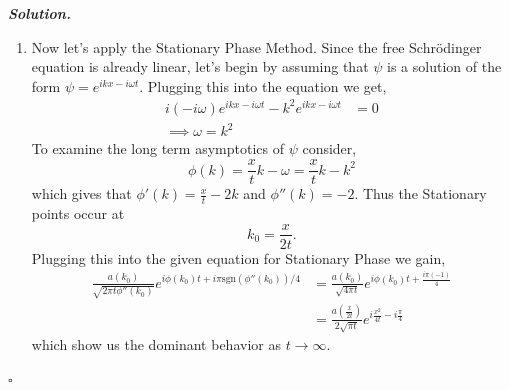 \documentclass[12pt]{report}
\newenvironment{solution}[1][\it{Solution}]{\textbf{#1. } }{$\square$}
\begin{document}
\begin{solution}
\begin{enumerate}
        \item Now let's apply the Stationary Phase Method. Since the free Schr\"odinger equation is already linear, let's begin by assuming that $\psi$ is a solution of the form $\psi = e^{ikx - i\omega t}$. Plugging this into the equation we get,
        \begin{align*}
            i(-i\omega)e^{ikx - i\omega t} - k^2 e^{ikx - i\omega t} &= 0\\
            \implies \omega = k^2
        \end{align*}
        To examine the long term asymptotics of $\psi$ consider,
        \[ \phi(k) = \frac{x}{t}k - \omega = \frac{x}{t}k - k^2\]
        which gives that $\phi'(k) = \frac{x}{t} - 2k$ and $\phi''(k) = -2$. Thus the Stationary points occur at \[k_0 = \frac{x}{2t}.\]  Plugging this into the given equation for Stationary Phase we gain,
        \begin{align*}
             \frac{a(k_0)}{\sqrt{2\pi t \phi''(k_0)}}e^{i\phi(k_0)t + i \pi \text{sgn}(\phi''(k_0))/4} &= \frac{a(k_0)}{\sqrt{4\pi t}}e^{i\phi(k_0)t + \frac{i\pi(-1)}{4}}\\
             &= \frac{a\left( \frac{x}{2t}\right)}{2\sqrt{\pi t}}e^{i \frac{x^2}{4t} - i \frac{\pi}{4}}
        \end{align*}
        which show us the dominant behavior as $t \rightarrow \infty$.
        

\end{enumerate}
\end{solution}
\end{document}
